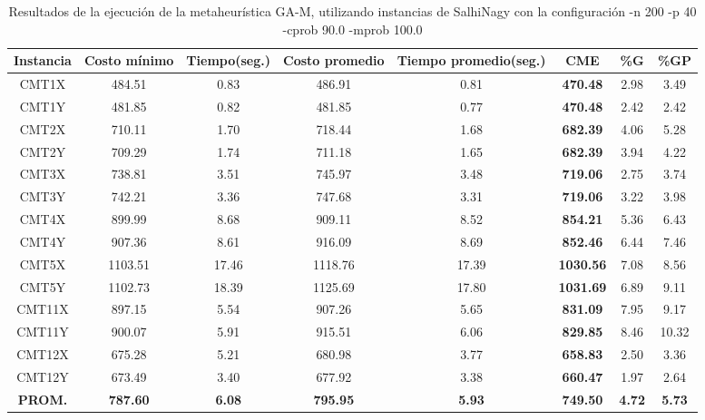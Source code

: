 \begin{table}[h]
\caption{Resultados de la ejecución de la metaheurística GA-M, utilizando instancias de SalhiNagy con la configuración -n 200 -p 40 -cprob 90.0 -mprob 100.0}
\centering
\small
\begin{tabular}{c c c c c c c c}
\hline\hline
Instancia & Costo mínimo & Tiempo(seg.) & Costo promedio & Tiempo promedio(seg.) & CME & \%G & \%GP \\ [0.5ex]
\hline
CMT1X & 484.51 & 0.83 & 
486.91 & 0.81 & \bf{470.48} & 
2.98 & 3.49\\CMT1Y & 481.85 & 0.82 & 
481.85 & 0.77 & \bf{470.48} & 
2.42 & 2.42\\CMT2X & 710.11 & 1.70 & 
718.44 & 1.68 & \bf{682.39} & 
4.06 & 5.28\\CMT2Y & 709.29 & 1.74 & 
711.18 & 1.65 & \bf{682.39} & 
3.94 & 4.22\\CMT3X & 738.81 & 3.51 & 
745.97 & 3.48 & \bf{719.06} & 
2.75 & 3.74\\CMT3Y & 742.21 & 3.36 & 
747.68 & 3.31 & \bf{719.06} & 
3.22 & 3.98\\CMT4X & 899.99 & 8.68 & 
909.11 & 8.52 & \bf{854.21} & 
5.36 & 6.43\\CMT4Y & 907.36 & 8.61 & 
916.09 & 8.69 & \bf{852.46} & 
6.44 & 7.46\\CMT5X & 1103.51 & 17.46 & 
1118.76 & 17.39 & \bf{1030.56} & 
7.08 & 8.56\\CMT5Y & 1102.73 & 18.39 & 
1125.69 & 17.80 & \bf{1031.69} & 
6.89 & 9.11\\CMT11X & 897.15 & 5.54 & 
907.26 & 5.65 & \bf{831.09} & 
7.95 & 9.17\\CMT11Y & 900.07 & 5.91 & 
915.51 & 6.06 & \bf{829.85} & 
8.46 & 10.32\\CMT12X & 675.28 & 5.21 & 
680.98 & 3.77 & \bf{658.83} & 
2.50 & 3.36\\CMT12Y & 673.49 & 3.40 & 
677.92 & 3.38 & \bf{660.47} & 
1.97 & 2.64\\\bf{PROM.} & 
\bf{787.60} & \bf{6.08} & \bf{795.95} & \bf{5.93} & \bf{749.50} & \bf{4.72} & \bf{5.73}\\[1ex]\hline
\end{tabular}
\label{table:nonlin}
\end{table}

